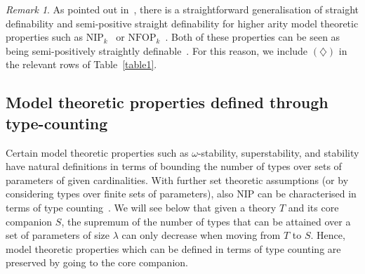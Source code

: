 \documentclass{amsart}
\theoremstyle{definition}
\theoremstyle{remark}
\newtheorem{remark}[theorem]{Remark}
\numberwithin{equation}{section}
\newcommand{\bB}{\mathfrak{B}}
\begin{document}
\begin{remark} As pointed out in~\cite{day2026notion}, there is a straightforward generalisation of straight definability and semi-positive straight definability for higher arity model theoretic properties such as $\mathrm{NIP}_k$~\cite{shelah2007definable,chernikov2019n} or $\mathrm{NFOP}_k$~\cite{terry2021higher,abd2025higher}. {Both of these properties} can be seen as being semi-positively straightly definable~\cite[Proposition 3.3]{day2025results}. For this reason, we include $(\diamondsuit)$ in the relevant rows of Table~\ref{table1}. 
\end{remark}

\subsection{Model theoretic properties defined through type-counting}\label{sub:typecounting}
Certain model theoretic properties such as $\omega$-stability, superstability, and stability have natural definitions in terms of bounding the number of types over sets of parameters of given cardinalities. With further set theoretic assumptions (or by considering types over finite sets of parameters), also $\mathrm{NIP}$ can be characterised in terms of type counting~\cite[Theorem 4.6]{shelah1971stability}. 
We will see below that given a theory $T$ and its core companion  $S$, the supremum of the number of types that can be attained over a set of parameters of size $\lambda$ can only decrease when moving from $T$ to $S$. Hence, model theoretic properties which can be defined in terms of type counting are preserved by going to the core companion. %
\end{document}
